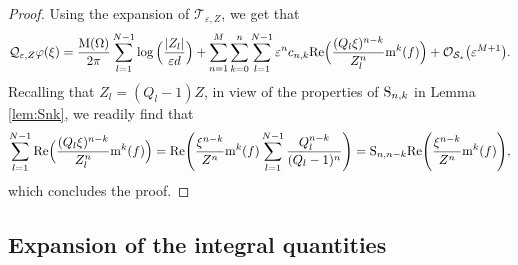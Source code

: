 \documentclass[11pt,reqno,a4paper]{amsart}
\def\eps{\varepsilon}
\def\epsilon{\varepsilon}
\def\Re{{\rm Re}}
\newcommand{\cO}{\mathcal{O}}
\newcommand{\cQ}{\mathcal{Q}}
\newcommand{\cS}{\mathcal{S}}
\newcommand{\cT}{\mathcal{T}}
\newcommand{\mrm}{\mathrm{m}}
\newcommand{\mrM}{\mathrm{M}}
\newcommand{\1}{\mathbbm{1}}
\theoremstyle{definition}
\theoremstyle{definition}
\numberwithin{equation}{section}
\begin{document}
\begin{proof}
 Using the expansion of $\cT_{\eps,Z}$, we get that
    \begin{align}
            \cQ_{\eps,Z} \varphi(\xi)=\frac{\mrM(\Omega)}{2\pi}\sum_{l=1}^{N-1}\log\Big(\frac{|Z_l|}{\eps d}\Big)
  +\sum_{n=1}^M\sum_{k=0}^{n} \sum_{l=1}^{N-1}\eps^nc_{n,k} \Re\Big(\frac{(Q_l\xi)^{n-k}}{Z_l^n}{\rm m}^k(f)\Big)+
\cO_{\cS_*}\bigl(\epsilon^{M+1}\bigr).
    \end{align}
     Recalling that $Z_l=(Q_l-1)Z$, in view of the properties of ${\rm S}_{n,k}$ in Lemma \ref{lem:Snk}, we readily find that
\begin{align}
    \sum_{l=1}^{N-1} \Re\Big(\frac{(Q_l\xi)^{n-k}}{Z_l^n}{\rm m}^k(f)\Big)=\Re\Bigg(\frac{\xi^{n-k}}{Z^n}\mrm^k(f)\sum_{l=1}^{N-1}\frac{Q_l^{n-k}}{(Q_l-1)^n}\Bigg)={\rm S}_{n,n-k}\Re\Bigg(\frac{\xi^{n-k}}{Z^n}\mrm^k(f)\Bigg),
\end{align}
which concludes the proof.




\end{proof}



\subsection{Expansion of the integral quantities}
\end{document}
